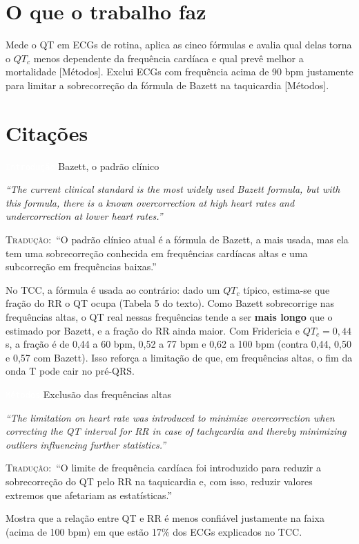 \documentclass[11pt,a4paper]{article}
\newcommand{\pagechip}[1]{{\setlength{\fboxsep}{1.5pt}\colorbox{cAcc}{\textcolor{white}{\scriptsize\texttt{#1}}}}}
\newenvironment{origquote}{\par\itshape\small}{\par}
\newenvironment{tradquote}{\par\small\textsc{Tradução:}\ }{\par}
\newcommand{\explab}[1]{\par\smallskip{\small\color{cAcc}\textbf{\MakeUppercase{#1}}}\par}
\begin{document}
\section{O que o trabalho faz}
Mede o QT em ECGs de rotina, aplica as cinco fórmulas e avalia qual delas torna o $QT_c$ menos dependente da frequência cardíaca e qual prevê melhor a mortalidade [Métodos]. Exclui ECGs com frequência acima de 90 bpm justamente para limitar a sobrecorreção da fórmula de Bazett na taquicardia [Métodos].

\section{Citações}

\begin{citacard}{\pagechip{Introdução} Bazett, o padrão clínico}
\begin{origquote}“The current clinical standard is the most widely used Bazett formula, but with this formula, there is a known overcorrection at high heart rates and undercorrection at lower heart rates.”\end{origquote}
\begin{tradquote}“O padrão clínico atual é a fórmula de Bazett, a mais usada, mas ela tem uma sobrecorreção conhecida em frequências cardíacas altas e uma subcorreção em frequências baixas.”\end{tradquote}
\explab{Explicação}
No TCC, a fórmula é usada ao contrário: dado um $QT_c$ típico, estima-se que fração do RR o QT ocupa (Tabela 5 do texto). Como Bazett sobrecorrige nas frequências altas, o QT real nessas frequências tende a ser \textbf{mais longo} que o estimado por Bazett, e a fração do RR ainda maior. Com Fridericia e $QT_c = 0{,}44$ s, a fração é de 0,44 a 60 bpm, 0,52 a 77 bpm e 0,62 a 100 bpm (contra 0,44, 0,50 e 0,57 com Bazett). Isso reforça a limitação de que, em frequências altas, o fim da onda T pode cair no pré-QRS.
\end{citacard}

\begin{citacard}{\pagechip{Métodos} Exclusão das frequências altas}
\begin{origquote}“The limitation on heart rate was introduced to minimize overcorrection when correcting the QT interval for RR in case of tachycardia and thereby minimizing outliers influencing further statistics.”\end{origquote}
\begin{tradquote}“O limite de frequência cardíaca foi introduzido para reduzir a sobrecorreção do QT pelo RR na taquicardia e, com isso, reduzir valores extremos que afetariam as estatísticas.”\end{tradquote}
\explab{Explicação}
Mostra que a relação entre QT e RR é menos confiável justamente na faixa (acima de 100 bpm) em que estão 17\% dos ECGs explicados no TCC.
\end{citacard}
\end{document}
